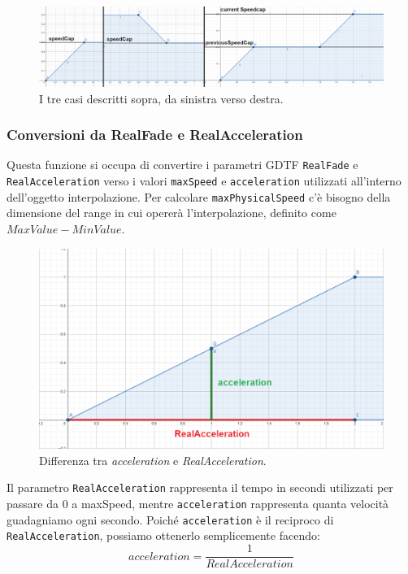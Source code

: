 \documentclass[main.tex]{subfiles}
\begin{document}
\begin{figure}[H]
    \centering
    \includegraphics[width=1\linewidth]{img/interpolazione/speedCapThreeCases.png}
    \caption{I tre casi descritti sopra, da sinistra verso destra.}
    \label{fig:4_speedCapThreeCases}
\end{figure}

\clearpage %
\subsubsection{Conversioni da RealFade e RealAcceleration}\label{subsubsec:4_2_Conversions}
Questa funzione si occupa di convertire i parametri GDTF \lstinline{RealFade} e \lstinline{RealAcceleration} verso i valori \lstinline{maxSpeed} e \lstinline{acceleration} utilizzati all'interno dell'oggetto interpolazione. Per calcolare \lstinline{maxPhysicalSpeed} c'è bisogno della dimensione del range in cui opererà l'interpolazione, definito come $MaxValue - MinValue$.\newline

\begin{figure}
    \centering
    \captionsetup{justification=centering}
    \includegraphics[scale=0.3]{img/interpolazione/RealAccelerationVSacceleration.png}
    \caption{Differenza tra \textit{acceleration} e \textit{RealAcceleration}.}
    \label{fig:4_RealAccelerationVSacceleration}
\end{figure}
Il parametro \lstinline{RealAcceleration} rappresenta il tempo in secondi utilizzati per passare da 0 a maxSpeed, mentre \lstinline{acceleration} rappresenta quanta velocità guadagniamo ogni secondo. Poiché \lstinline{acceleration} è il reciproco di \lstinline{RealAcceleration}, possiamo ottenerlo semplicemente facendo:
\[acceleration = \frac{1}{RealAcceleration}\] \newline
\end{document}
